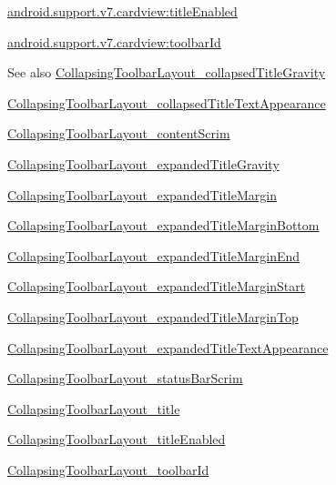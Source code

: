 {\ttfamily \hyperlink{classandroid_1_1support_1_1v7_1_1cardview_1_1R_1_1styleable_ac3162e6203b6488dcc98da969976ddda}{android.\+support.\+v7.\+cardview\+:title\+Enabled}}

{\ttfamily \hyperlink{classandroid_1_1support_1_1v7_1_1cardview_1_1R_1_1styleable_aa0ae88a0aabadbd92010e714caca1dd0}{android.\+support.\+v7.\+cardview\+:toolbar\+Id}}

\begin{DoxySeeAlso}{See also}
\hyperlink{classandroid_1_1support_1_1v7_1_1cardview_1_1R_1_1styleable_aca98ea1812eddbb1cc47a7e5900bd6ac}{Collapsing\+Toolbar\+Layout\+\_\+collapsed\+Title\+Gravity} 

\hyperlink{classandroid_1_1support_1_1v7_1_1cardview_1_1R_1_1styleable_ad3a48e5593ffa8db03af733e76a429f2}{Collapsing\+Toolbar\+Layout\+\_\+collapsed\+Title\+Text\+Appearance} 

\hyperlink{classandroid_1_1support_1_1v7_1_1cardview_1_1R_1_1styleable_a4788b65165005d22b0fc4665a27806a3}{Collapsing\+Toolbar\+Layout\+\_\+content\+Scrim} 

\hyperlink{classandroid_1_1support_1_1v7_1_1cardview_1_1R_1_1styleable_aea2383ec907327db77221d2a33d06306}{Collapsing\+Toolbar\+Layout\+\_\+expanded\+Title\+Gravity} 

\hyperlink{classandroid_1_1support_1_1v7_1_1cardview_1_1R_1_1styleable_af7f7bf893630b5286fdcaec73cb489c5}{Collapsing\+Toolbar\+Layout\+\_\+expanded\+Title\+Margin} 

\hyperlink{classandroid_1_1support_1_1v7_1_1cardview_1_1R_1_1styleable_ad9b7a75fc3bd07996d8b38480cb5e7a2}{Collapsing\+Toolbar\+Layout\+\_\+expanded\+Title\+Margin\+Bottom} 

\hyperlink{classandroid_1_1support_1_1v7_1_1cardview_1_1R_1_1styleable_a9ba764a19d59fb616535b8b928a3ab0c}{Collapsing\+Toolbar\+Layout\+\_\+expanded\+Title\+Margin\+End} 

\hyperlink{classandroid_1_1support_1_1v7_1_1cardview_1_1R_1_1styleable_a9da9e2540ee41e2bf5cf6e02ca2d940f}{Collapsing\+Toolbar\+Layout\+\_\+expanded\+Title\+Margin\+Start} 

\hyperlink{classandroid_1_1support_1_1v7_1_1cardview_1_1R_1_1styleable_adb4d112ba91dd0c5abf011eb88af2a2b}{Collapsing\+Toolbar\+Layout\+\_\+expanded\+Title\+Margin\+Top} 

\hyperlink{classandroid_1_1support_1_1v7_1_1cardview_1_1R_1_1styleable_a216b5b490333f10034ece0d07367bcf2}{Collapsing\+Toolbar\+Layout\+\_\+expanded\+Title\+Text\+Appearance} 

\hyperlink{classandroid_1_1support_1_1v7_1_1cardview_1_1R_1_1styleable_ac95b8a59eb9582467255c194e9d8546c}{Collapsing\+Toolbar\+Layout\+\_\+status\+Bar\+Scrim} 

\hyperlink{classandroid_1_1support_1_1v7_1_1cardview_1_1R_1_1styleable_a7bb1d248c841d16154184e1f8bbc0581}{Collapsing\+Toolbar\+Layout\+\_\+title} 

\hyperlink{classandroid_1_1support_1_1v7_1_1cardview_1_1R_1_1styleable_ac3162e6203b6488dcc98da969976ddda}{Collapsing\+Toolbar\+Layout\+\_\+title\+Enabled} 

\hyperlink{classandroid_1_1support_1_1v7_1_1cardview_1_1R_1_1styleable_aa0ae88a0aabadbd92010e714caca1dd0}{Collapsing\+Toolbar\+Layout\+\_\+toolbar\+Id} 
\end{DoxySeeAlso}
